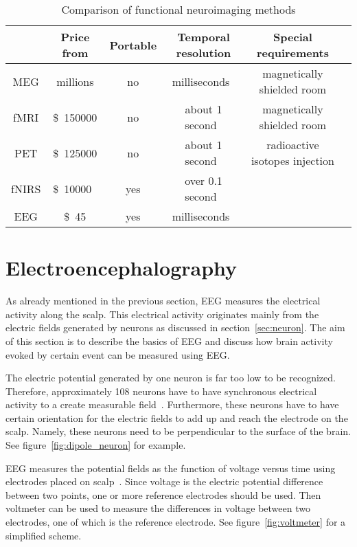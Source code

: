 \begin{table}[h]
	\centering
	\begin{tabular}{|c|c|c|c|c|c|}\hline
			& Price	from				& Portable	& Temporal resolution		& Special requirements			\\\hline
\gls{MEG}	& millions\pMEG				& no		& milliseconds~\tresol		& magnetically shielded room	\\\hline
\gls{fMRI}	& \SI{150000}[\$]\pfMRI		& no		& about 1 second~\tresol	& magnetically shielded room	\\\hline
\gls{PET}	& \SI{125000}[\$]\pPET		& no		& about 1 second~\tresol	& radioactive isotopes injection\\\hline
\gls{fNIRS}	& \SI{10000}[\$]{}~\pNIRS	& yes		& over 0.1 second~\pNIRS	&								\\\hline
\gls{EEG}	& \SI{45}[\$]\pEEG			& yes		& milliseconds~\tresol		&								\\\hline
	\end{tabular}
	\caption{Comparison of functional neuroimaging methods}
	\label{tab:neuroimaging}
\end{table}

\section{Electroencephalography}
\label{sec:EEG}

As already mentioned in the previous section, \gls{EEG} measures the electrical activity along the scalp. This electrical activity originates mainly from the electric fields generated by \glspl{neuron} as discussed in section~\ref{sec:neuron}. The aim of this section is to describe the basics of \gls{EEG} and discuss how brain activity evoked by certain event can be measured using \gls{EEG}.

The electric potential generated by one \gls{neuron} is far too low to be recognized. Therefore, approximately 108 \glspl{neuron} have to have synchronous electrical activity to a create measurable field~\cite{field_count}. Furthermore, these \glspl{neuron} have to have certain orientation for the electric fields to add up and reach the electrode on the scalp. Namely, these neurons need to be perpendicular to the surface of the brain. See figure~\ref{fig:dipole_neuron} for example.

\gls{EEG} measures the potential fields as the function of voltage versus time using electrodes placed on scalp~\cite{field_count}. Since voltage is the electric potential difference between two points, one or more reference electrodes should be used. Then voltmeter can be used to measure the differences in voltage between two electrodes, one of which is the reference electrode. See figure~\ref{fig:voltmeter} for a simplified scheme.

